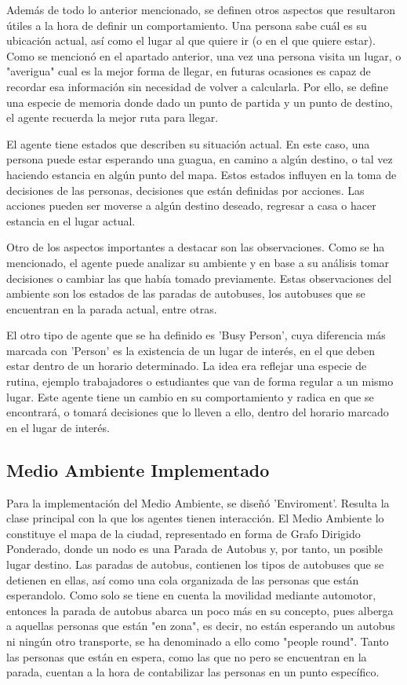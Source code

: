 \documentclass{article}
\begin{document}
Además de todo lo anterior mencionado, se definen otros aspectos que resultaron útiles a la hora de definir un comportamiento. Una persona sabe cuál es su ubicación actual, así como el lugar al que quiere ir (o en el que quiere estar). Como se mencionó en el apartado anterior, una vez una persona visita un lugar, o "averigua" cual es la mejor forma de llegar, en futuras ocasiones es capaz de recordar esa información sin necesidad de volver a calcularla. Por ello, se define una especie de memoria donde dado un punto de partida y un punto de destino, el agente recuerda la mejor ruta para llegar. 

El agente tiene estados que describen su situación actual. En este caso, una persona puede estar esperando una guagua, en camino a algún destino, o tal vez haciendo estancia en algún punto del mapa. Estos estados influyen en la toma de decisiones de las personas, decisiones que están definidas por acciones. Las acciones pueden ser moverse a algún destino deseado, regresar a casa o hacer estancia en el lugar actual.

Otro de los aspectos importantes a destacar son las observaciones. Como se ha mencionado, el agente puede analizar su ambiente y en base a su análisis tomar decisiones o cambiar las que había tomado previamente. Estas observaciones del ambiente son los estados de las paradas de autobuses, los autobuses que se encuentran en la parada actual, entre otras.

El otro tipo de agente que se ha definido es 'Busy Person', cuya diferencia más marcada con 'Person' es la existencia de un lugar de interés, en el que deben estar dentro de un horario determinado. La idea era reflejar una especie de rutina, ejemplo trabajadores o estudiantes que van de forma regular a un mismo lugar. Este agente tiene un cambio en su comportamiento y radica en que se encontrará, o tomará decisiones que lo lleven a ello, dentro del horario marcado en el lugar de interés.

\subsection{Medio Ambiente Implementado}
Para la implementación del Medio Ambiente, se diseñó 'Enviroment'. Resulta la clase principal con la que los agentes tienen interacción. El Medio Ambiente lo constituye el mapa de la ciudad, representado en forma de Grafo Dirigido Ponderado, donde un nodo es una Parada de Autobus y, por tanto, un posible lugar destino. Las paradas de autobus, contienen los tipos de autobuses que se detienen en ellas, así como una cola organizada de las personas que están esperandolo. Como solo se tiene en cuenta la movilidad mediante automotor, entonces la parada de autobus abarca un poco más en su concepto, pues alberga a aquellas personas que están "en zona", es decir, no están esperando un autobus ni ningún otro transporte, se ha denominado a ello como "people round". Tanto las personas que están en espera, como las que no pero se encuentran en la parada, cuentan a la hora de contabilizar las personas en un punto específico.
\end{document}
